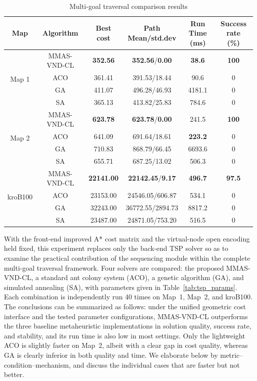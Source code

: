 \begin{table}[!t]
\caption{Multi-goal traversal comparison results}
\label{tab:tsp_cmp}
\centering
\scriptsize
\setlength{\tabcolsep}{2.5pt}
\begin{tabular}{cccccc}
\toprule
Map & Algorithm & Best cost & \makecell{Path\\Mean/std.dev} & \makecell{Run Time\\(ms)} & \makecell{Success rate\\(\%)} \\
\midrule
 \multirow{4}{*}{Map 1} & MMAS-VND-CL & \textbf{352.56} & \textbf{352.56}/\textbf{0.00} & \textbf{38.6} & \textbf{100} \\
   & ACO & 361.41 & 391.53/18.44 & 90.6 & 0 \\
   & GA & 411.07 & 496.28/46.93 & 4181.1 & 0 \\
   & SA & 365.13 & 413.82/25.83 & 784.6 & 0 \\
\midrule
 \multirow{4}{*}{Map 2} & MMAS-VND-CL & \textbf{623.78} & \textbf{623.78}/\textbf{0.00} & 241.5 & \textbf{100} \\
   & ACO & 641.09 & 691.64/18.61 & \textbf{223.2} & 0 \\
   & GA & 710.83 & 868.79/66.45 & 6693.6 & 0 \\
   & SA & 655.71 & 687.25/13.02 & 506.3 & 0 \\
\midrule
 \multirow{4}{*}{kroB100} & MMAS-VND-CL & \textbf{22141.00} & \textbf{22142.45}/\textbf{9.17} & \textbf{496.7} & \textbf{97.5} \\
   & ACO & 23153.00 & 24546.05/606.87 & 534.1 & 0 \\
   & GA & 32243.00 & 36772.55/2894.73 & 8817.2 & 0 \\
   & SA & 23487.00 & 24871.05/753.20 & 516.5 & 0 \\
\bottomrule
\end{tabular}
\end{table}

With the front-end improved A* cost matrix and the virtual-node open encoding held fixed, this experiment replaces only the back-end TSP solver so as to examine the practical contribution of the sequencing module within the complete multi-goal traversal framework. Four solvers are compared: the proposed MMAS-VND-CL, a standard ant colony system (ACO), a genetic algorithm (GA), and simulated annealing (SA), with parameters given in Table~\textcolor{blue}{\ref{tab:tsp_params}}. Each combination is independently run 40 times on Map~1, Map~2, and kroB100. The conclusions can be summarized as follows: under the unified geometric cost interface and the tested parameter configurations, MMAS-VND-CL outperforms the three baseline metaheuristic implementations in solution quality, success rate, and stability, and its run time is also low in most settings. Only the lightweight ACO is slightly faster on Map~2, albeit with a clear gap in cost quality, whereas GA is clearly inferior in both quality and time. We elaborate below by metric--condition--mechanism, and discuss the individual cases that are faster but not better.

